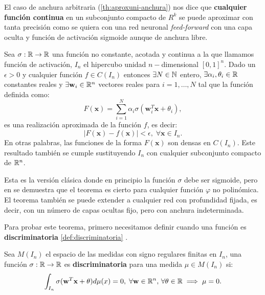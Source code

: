 El caso de anchura arbitraria (\autoref{th:aproxuni-anchura}) nos dice que \textbf{cualquier función continua} en un subconjunto compacto de $R^k$ se puede aproximar con tanta precisión como se quiera con una red neuronal \emph{feed-forward} con una capa oculta y función de activación sigmoide aunque de anchura libre.

\begin{teorema}
  Sea $\sigma : \mathbb{R} \to \mathbb{R}$ una función no constante, acotada y continua a la que llamamos función de activación, $I_n$ el hipercubo unidad $n-$dimensional $[0, 1]^n$. Dado un $\epsilon > 0$ y cualquier función $f \in C(I_n)$ entonces $\exists N \in \mathbb{N}$ entero, $\exists \alpha_i, \theta_i \in \mathbb{R}$ constantes reales y $\exists \textbf{w}_i \in \mathbb{R}^n$ vectores reales para $i = 1, \ldots, N$ tal que la función definida como:
  $$F(\textbf{x}) = \sum \limits^N_{i = 1} \alpha_i \sigma \left(\textbf{w}^T_i \textbf{x} + \theta_i \right),$$
  es una realización aproximada de la función $f$, es decir:
  $$|F(\textbf{x}) - f(\textbf{x})| < \epsilon, \; \forall \textbf{x} \in I_n.$$
  En otras palabras, las funciones de la forma $F(\textbf{x})$ son densas en $C(I_n)$. Este resultado también se cumple sustituyendo $I_n$ con cualquier subconjunto compacto de $\mathbb{R}^n$.
  \label{th:aproxuni-anchura}
\end{teorema}

Esta es la versión clásica donde en principio la función $\sigma$ debe ser sigmoide, pero en \cite{leshno1993multilayer} se demuestra que el teorema es cierto para cualquier función $\varphi$ no polinómica. El teorema también se puede extender a cualquier red con profundidad fijada, es decir, con un número de capas ocultas fijo, pero con anchura indeterminada.

Para probar este teorema, primero necesitamos definir cuando una función es \textbf{discriminatoria} \autoref{def:discriminatoria} \cite{cybenko1989approximation}.

\begin{definicion}
  Sea $M(I_n)$ el espacio de las medidas con signo regulares finitas en $I_n$, una función $\sigma: \mathbb{R} \to \mathbb{R}$ es \textbf{discriminatoria} para una medida $\mu \in M(I_n)$ si:
  $$\int_{I_n} \sigma(\textbf{w}^T \textbf{x} + \theta) d\mu(x) = 0, \; \forall \textbf{w} \in \mathbb{R}^n, \, \forall \theta \in \mathbb{R} \implies \mu = 0.$$
  \label{def:discriminatoria}
\end{definicion}

